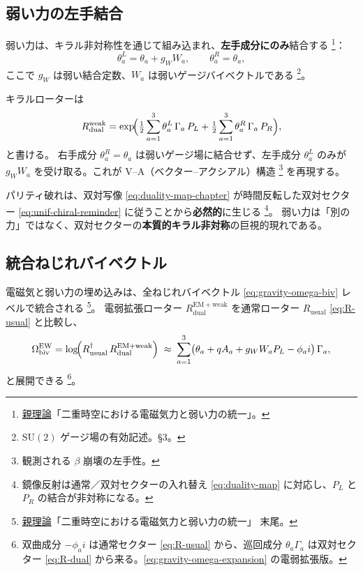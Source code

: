 \documentclass[dvipdfmx,a4paper,oneside]{jsbook}
\numberwithin{equation}{chapter}
\begin{document}
\subsection{弱い力の左手結合}

弱い力は、キラル非対称性を通じて組み込まれ、\textbf{左手成分にのみ}結合する \footnote{\hyperref[sec:sister-manuscripts]{親理論}「二重時空における電磁気力と弱い力の統一」。}：
\begin{equation}
  \theta_a^{L} = \theta_a + g_W W_a,
  \qquad
  \theta_a^{R} = \theta_a,
  \label{eq:unif-weak-shift}
\end{equation}
ここで \(g_W\) は弱い結合定数、\(W_a\) は弱いゲージバイベクトルである \footnote{\(\mathrm{SU}(2)\) ゲージ場の有効記述。§3。}。

キラルローターは
\begin{equation}
  R_{\mathrm{dual}}^{\mathrm{weak}}
  = \exp\!\Bigl(
    \tfrac{1}{2}\sum_{a=1}^{3}\theta_a^{L}\,\Gamma_a\, P_L
    + \tfrac{1}{2}\sum_{a=1}^{3}\theta_a^{R}\,\Gamma_a\, P_R
  \Bigr),
  \label{eq:unif-R-dual-weak}
\end{equation}
と書ける。
右手成分 \(\theta_a^{R} = \theta_a\) は弱いゲージ場に結合せず、左手成分 \(\theta_a^{L}\) のみが \(g_W W_a\) を受け取る。これが V--A（ベクター--アクシアル）構造 \footnote{観測される \(\beta\) 崩壊の左手性。} を再現する。

パリティ破れは、双対写像 \eqref{eq:duality-map-chapter} が時間反転した双対セクター \eqref{eq:unif-chiral-reminder} に従うことから\textbf{必然的}に生じる \footnote{鏡像反射は通常／双対セクターの入れ替え \eqref{eq:duality-map} に対応し、\(P_L\) と \(P_R\) の結合が非対称になる。}。
弱い力は「別の力」ではなく、双対セクターの\textbf{本質的キラル非対称}の巨視的現れである。

\subsection{統合ねじれバイベクトル}

電磁気と弱い力の埋め込みは、全ねじれバイベクトル \eqref{eq:gravity-omega-biv} レベルで統合される \footnote{\hyperref[sec:sister-manuscripts]{親理論}「二重時空における電磁気力と弱い力の統一」 末尾。}。
電弱拡張ローター \(R_{\mathrm{dual}}^{\mathrm{EM+weak}}\) を通常ローター \(R_{\mathrm{usual}}\) \eqref{eq:R-usual} と比較し、
\begin{equation}
  \Omega_{\mathrm{biv}}^{\mathrm{EW}}
  = \log\!\Bigl(
    R_{\mathrm{usual}}^\dagger\, R_{\mathrm{dual}}^{\mathrm{EM+weak}}
  \Bigr)
  \;\approx\;
  \sum_{a=1}^{3}\bigl(
    \theta_a + q A_a + g_W W_a P_L - \phi_a i
  \bigr)\,\Gamma_a,
  \label{eq:unif-Omega-EW}
\end{equation}
と展開できる \footnote{双曲成分 \(-\phi_a i\) は通常セクター \eqref{eq:R-usual} から、巡回成分 \(\theta_a \Gamma_a\) は双対セクター \eqref{eq:R-dual} から来る。\eqref{eq:gravity-omega-expansion} の電弱拡張版。}。
\end{document}

